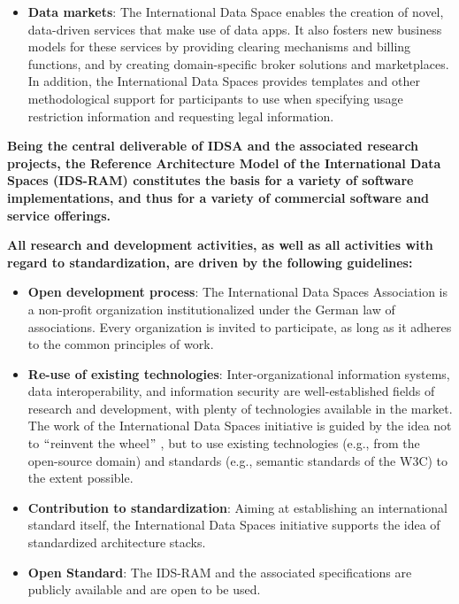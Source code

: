 \begin{itemize}
	\item \textbf{Data markets}: The International Data Space enables the creation of novel, data-driven services that make use of data apps. It also fosters new business models for these services by providing clearing mechanisms and billing functions, and by creating domain-specific broker solutions and marketplaces. In addition, the International Data Spaces provides templates and other methodological support for participants to use when specifying usage restriction information and requesting legal information. 

\end{itemize}

\textbf{Being the central deliverable of IDSA and the associated research projects, the Reference Architecture Model of the International Data Spaces (IDS-RAM) constitutes the basis for a variety of software implementations, and thus for a variety of commercial software and service offerings.}


\textbf{All research and development activities, as well as all activities with regard to standardization, are driven by the following guidelines:}

\begin{itemize}

	\item \textbf{Open development process}: The International Data Spaces Association is a non-profit organization institutionalized under the German law of associations. Every organization is invited to participate, as long as it adheres to the common principles of work.

	\item \textbf{Re-use of existing technologies}: Inter-organizational information systems, data interoperability, and information security are well-established fields of research and development, with plenty of technologies available in the market. The work of the International Data Spaces initiative is guided by the idea not to $``$reinvent the wheel$"$ , but to use existing technologies (e.g., from the open-source domain) and standards (e.g., semantic standards of the W3C) to the extent possible.

	\item \textbf{Contribution to standardization}: Aiming at establishing an international standard itself, the International Data Spaces initiative supports the idea of standardized architecture stacks.
	
	\item \textbf{Open Standard}: The IDS-RAM and the associated specifications are publicly available and are open to be used.

\end{itemize}


